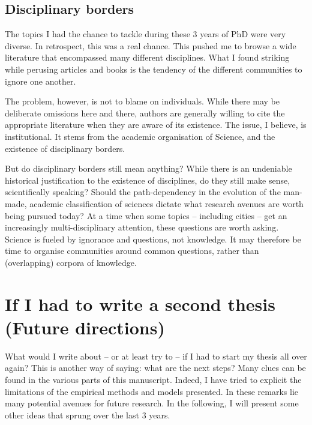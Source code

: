 \subsection{Disciplinary borders}
\label{sub:disciplinary_borders}


The topics I had the chance to tackle during these 3 years of PhD were very
diverse. In retrospect, this was a real chance. This pushed me to browse a wide
literature that encompassed many different disciplines. What I found striking
while perusing articles and books is the tendency of the different communities to
ignore one another. 

The problem, however, is not to blame on individuals. While there may be
deliberate omissions here and there, authors are generally willing to cite the
appropriate literature when they are aware of its existence. The issue, I
believe, is institutional. It stems from the academic organisation of Science,
and the existence of disciplinary borders.

But do disciplinary borders still mean anything? While there is an undeniable
historical justification to the existence of disciplines, do they still make
sense, scientifically speaking? Should the path-dependency in the evolution of
the man-made, academic classification of sciences dictate what research avenues
are worth being pursued today? At a time when some topics -- including cities
-- get an increasingly multi-disciplinary attention, these questions are worth
asking. Science is fueled by ignorance and questions, not knowledge. It may therefore be
time to organise communities around common questions, rather than (overlapping)
corpora of knowledge.


\section{If I had to write a second thesis (Future directions)}
\label{sec:limitations}

What would I write about -- or at least try to -- if I had to start my
thesis all over again? This is another way of saying: what are the next steps?
Many clues can be found in the various parts of this manuscript. Indeed, I have tried
to explicit the limitations of the empirical methods and models presented. In
these remarks lie many potential avenues for future research. In the following,
I will present some other ideas that sprung over the last $3$ years.\\

